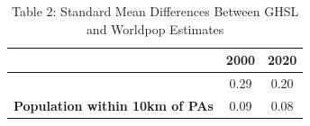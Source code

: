 \begin{table}[t]
\caption*{
{\fontsize{10}{13}\selectfont  Table 2: Standard Mean Differences Between GHSL and Worldpop Estimates\fontsize{8}{10}\selectfont }
} 
\fontsize{8.0pt}{10.0pt}\selectfont
\begin{tabular*}{\linewidth}{@{\extracolsep{\fill}}ccc}
\toprule
 & {\bfseries 2000} & {\bfseries 2020} \\ 
\midrule\addlinespace[2.5pt]
{\bfseries Population within PAs} & 0.29 & 0.20 \\ 
{\bfseries Population within 10km of PAs} & 0.09 & 0.08 \\ 
\bottomrule
\end{tabular*}
\end{table}

